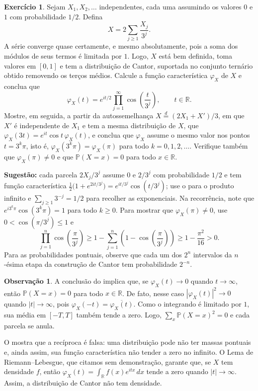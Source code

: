 \documentclass[12pt,portuguese]{article}
\theoremstyle{definition}
\theoremstyle{plainexercise}
\theoremstyle{starredexercise}
\newtheorem{starredexercise}[exercise]{Exercício}
\theoremstyle{definition}
\newtheorem*{remark*}{Observação}
\begin{document}
\begin{starredexercise}\label{exercise:cantor}
Sejam $X_1,X_2,\dots$ independentes, cada uma assumindo os valores $0$ e $1$
com probabilidade $1/2$. Defina
\[
  X=2\sum_{j\geqslant1}\frac{X_j}{3^{j}}.
\]
A série converge quase certamente, e mesmo absolutamente, pois a soma dos
módulos de seus termos é limitada por $1$. Logo, $X$ está bem definida, toma
valores em $[0,1]$ e tem a distribuição de Cantor, suportada no conjunto
ternário obtido removendo os terços médios. Calcule a função característica
$\varphi_X$ de $X$ e conclua que
\[
  \varphi_X(t)=e^{it/2}\prod_{j=1}^{\infty}\cos\!\left(\frac{t}{3^{j}}\right),
  \qquad t\in\mathbb{R}.
\]
Mostre, em seguida, a partir da autossemelhança
$X\overset{d}{=}(2X_1+X')/3$, em que $X'$ é independente de $X_1$ e tem a mesma
distribuição de $X$, que $\varphi_X(3t)=e^{it}\cos t\,\varphi_X(t)$, e conclua que
$\varphi_X$ assume o mesmo valor nos pontos $t=3^{k}\pi$, isto é,
$\varphi_X(3^{k}\pi)=\varphi_X(\pi)$ para todo $k=0,1,2,\dots$. Verifique também
que $\varphi_X(\pi)\neq0$ e que $\mathbb{P}(X=x)=0$ para todo $x\in\mathbb{R}$.

\noindent\textbf{Sugestão:} cada parcela $2X_j/3^{j}$ assume $0$ e $2/3^{j}$ com
probabilidade $1/2$ e tem função característica
$\tfrac12\bigl(1+e^{2it/3^{j}}\bigr)=e^{it/3^{j}}\cos(t/3^{j})$; use
o  para o produto infinito e
$\sum_{j\geqslant1}3^{-j}=1/2$ para recolher as exponenciais. Na recorrência,
note que $e^{i3^{k}\pi}\cos(3^{k}\pi)=1$ para todo $k\geqslant0$. Para mostrar
que $\varphi_X(\pi)\neq0$, use $0<\cos(\pi/3^j)\leqslant1$ e
\[
\prod_{j=1}^n\cos\left(\frac{\pi}{3^j}\right)
\geqslant1-\sum_{j=1}^n\left(1-\cos\left(\frac{\pi}{3^j}\right)\right)
\geqslant1-\frac{\pi^2}{16}>0.
\]
Para as probabilidades pontuais, observe que cada um dos $2^n$ intervalos da
$n$-ésima etapa da construção de Cantor tem probabilidade $2^{-n}$.
\end{starredexercise}

\begin{remark*}
A conclusão do  implica que, se
$\varphi_X(t)\to0$ quando $t\to\infty$, então $\mathbb{P}(X=x)=0$ para todo
$x\in\mathbb{R}$. De fato, nesse caso $|\varphi_X(t)|^2\to0$ quando
$|t|\to\infty$, pois $\varphi_X(-t)=\overline{\varphi_X(t)}$. Como o integrando é
limitado por $1$, sua média em $[-T,T]$ também tende a zero. Logo,
$\sum_x\mathbb{P}(X=x)^2=0$ e cada parcela se anula.

O  mostra que a recíproca é falsa: uma distribuição pode
não ter massas pontuais e, ainda assim, sua função característica não tender a
zero no infinito. O Lema de Riemann--Lebesgue, que citamos sem demonstração,
garante que, se $X$ tem densidade $f$, então
$\varphi_X(t)=\int_{\mathbb{R}}f(x)e^{itx}\,dx$ tende a zero quando
$|t|\to\infty$. Assim, a distribuição de Cantor não tem densidade.
\end{remark*}
\end{document}
